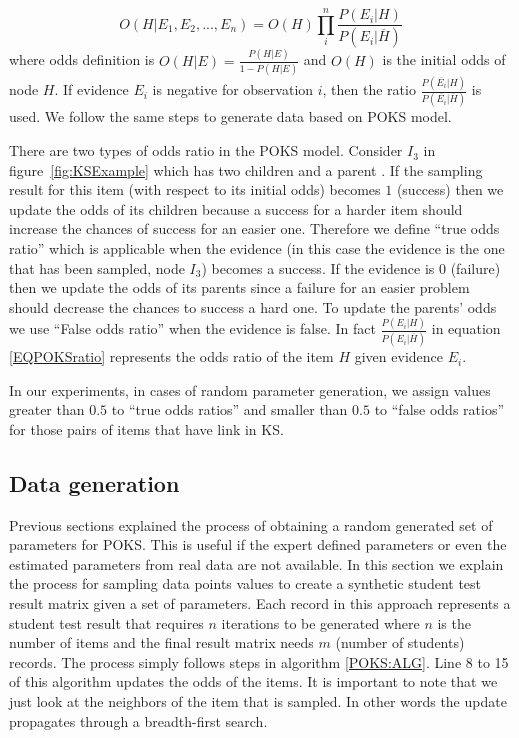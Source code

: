 \begin{equation}
O(H|E_1,E_2, ... , E_n) = O(H) \prod_{i}^{n} \frac{P(E_i|H)}{P(E_i | \overline{H})}
\label{EQPOKSratio}
\end{equation}
where odds definition is $O(H|E) = \frac{P(H|E)}{1-P(H|E)}$ and $O(H)$ is the initial odds of node $H$. If evidence $E_i$ is negative for observation $i$, then the ratio $\frac{P(\overline{E_i}|H)}{P(\overline{E_i}|\overline{H})}$ is used. We follow the same steps to generate data based on POKS model. 

There are two types of odds ratio in the POKS model. Consider $I_{3}$ in figure~\ref{fig:KSExample} which has two children and a parent . If the sampling result for this item (with respect to its initial odds) becomes $1$ (success) then we update the odds of its children because a success for a harder item should increase the chances of success for an easier one. Therefore we define ``true odds ratio'' which is applicable when the evidence (in this case the evidence is the one that has been sampled,  node $I_{3}$) becomes a success. If the evidence is $0$ (failure) then we update the odds of its parents since a failure for an easier problem should decrease the chances to success a hard one. To update the parents' odds we use ``False odds ratio'' when the evidence is false. In fact $\frac{P(E_i|H)}{P(E_i | \overline{H})}$ in equation \ref{EQPOKSratio} represents the odds ratio of the item $H$ given evidence $E_i$. 

In our experiments, in cases of random parameter generation, we assign values greater than $0.5$ to ``true odds ratios'' and smaller than $0.5$ to ``false odds ratios'' for those pairs of items that have link in KS. 

\subsection{Data generation}

Previous sections explained the process of obtaining a random generated set of parameters for POKS. This is useful if the expert defined parameters or even the estimated parameters from real data are not available. In this section we explain the process for sampling data points values to create a synthetic student test result matrix given a set of parameters. Each record in this approach represents a student test result that requires $n$ iterations to be generated where $n$ is the number of items and the final result matrix needs $m$ (number of students) records. The process simply follows steps in algorithm \ref{POKS:ALG}. Line 8 to 15 of this algorithm updates the odds of the items. It is important to note that we just look at the neighbors of the item that is sampled. In other words the update propagates through a breadth-first search.


